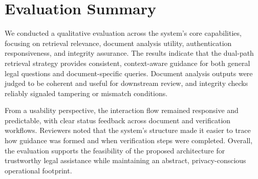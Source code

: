 \section{Evaluation Summary}
\label{sec:results}

We conducted a qualitative evaluation across the system's core capabilities, focusing on retrieval relevance, document analysis utility, authentication responsiveness, and integrity assurance. The results indicate that the dual-path retrieval strategy provides consistent, context-aware guidance for both general legal questions and document-specific queries. Document analysis outputs were judged to be coherent and useful for downstream review, and integrity checks reliably signaled tampering or mismatch conditions.

From a usability perspective, the interaction flow remained responsive and predictable, with clear status feedback across document and verification workflows. Reviewers noted that the system's structure made it easier to trace how guidance was formed and when verification steps were completed. Overall, the evaluation supports the feasibility of the proposed architecture for trustworthy legal assistance while maintaining an abstract, privacy-conscious operational footprint.
